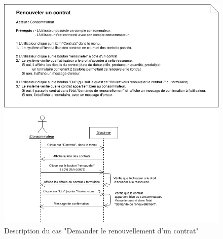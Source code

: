 \documentclass[12pt]{report}
\begin{document}
\begin{figure}[!h]
\centering
\includegraphics[width=1.\textwidth]{./ressources/desc_UC_demander_renouvellement.png}
\caption{Description du cas "Demander le renouvellement d'un contrat"}
\end{figure}
\clearpage
\end{document}
